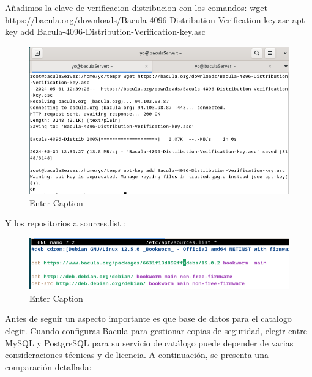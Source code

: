 Añadimos la clave de verificacion distribucion con los comandos:
  wget https://bacula.org/downloads/Bacula-4096-Distribution-Verification-key.asc
  apt-key add Bacula-4096-Distribution-Verification-key.asc
  

  

\begin{figure}[H]
    \centering
    \includegraphics[width=0.5\linewidth]{instalacionBacula/baculaSignature.png}
    \caption{Enter Caption}
\end{figure}

Y los repositorios a sources.list :

\begin{figure}[H]
    \centering
    \includegraphics[width=0.5\linewidth]{instalacionBacula/baculaRepositorio.png}
    \caption{Enter Caption}
\end{figure}

Antes de seguir un aspecto importante es que base de datos para el catalogo elegir.
Cuando configuras Bacula para gestionar copias de seguridad, elegir entre MySQL y PostgreSQL para su servicio de catálogo puede depender de varias consideraciones técnicas y de licencia. A continuación, se presenta una comparación detallada:


